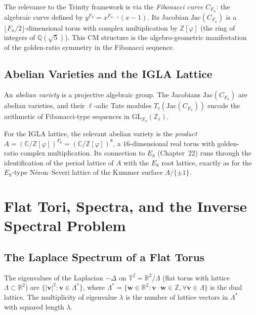 The relevance to the Trinity framework is via the \emph{Fibonacci curve} $C_{F_n}$:
the algebraic curve defined by $y^{F_n} = x^{F_{n-1}}(x-1)$.
Its Jacobian $\mathrm{Jac}(C_{F_n})$ is a $\lfloor F_n/2\rfloor$-dimensional torus
with complex multiplication by $\mathbb{Z}[\varphi]$ (the ring of integers of
$\mathbb{Q}(\sqrt{5})$).
This CM structure is the algebro-geometric manifestation of the golden-ratio symmetry
in the Fibonacci sequence.

\subsection{Abelian Varieties and the IGLA Lattice}\label{subsec:ch18-abelian-variety}

An \emph{abelian variety} is a projective algebraic group.
The Jacobians $\mathrm{Jac}(C_{F_n})$ are abelian varieties, and their
$\ell$-adic Tate modules $T_\ell(\mathrm{Jac}(C_{F_n}))$ encode the arithmetic
of Fibonacci-type sequences in $\mathrm{GL}_{F_n}(\mathbb{Z}_\ell)$.

For the IGLA lattice, the relevant abelian variety is the \emph{product}
$A = (\mathbb{C}/\mathbb{Z}[\varphi])^{F_6} = (\mathbb{C}/\mathbb{Z}[\varphi])^8$,
a $16$-dimensional real torus with golden-ratio complex multiplication.
Its connection to $E_8$ (Chapter~22) runs through the identification of the
period lattice of $A$ with the $E_8$ root lattice, exactly as for the
$E_8$-type Néron--Severi lattice of the Kummer surface $A/\{\pm 1\}$.

\section{Flat Tori, Spectra, and the Inverse Spectral Problem}
\label{sec:ch18-inverse-spectral}

\subsection{The Laplace Spectrum of a Flat Torus}\label{subsec:ch18-laplace-spectrum}

The eigenvalues of the Laplacian $-\Delta$ on $\mathbb{T}^2 = \mathbb{R}^2/\Lambda$
(flat torus with lattice $\Lambda \subset \mathbb{R}^2$) are
$\{|\mathbf{v}|^2 : \mathbf{v} \in \Lambda^*\}$, where $\Lambda^* = \{\mathbf{w} \in \mathbb{R}^2 : \mathbf{v}\cdot\mathbf{w} \in \mathbb{Z}, \forall \mathbf{v} \in \Lambda\}$
is the dual lattice.
The multiplicity of eigenvalue $\lambda$ is the number of lattice vectors in $\Lambda^*$
with squared length $\lambda$.

